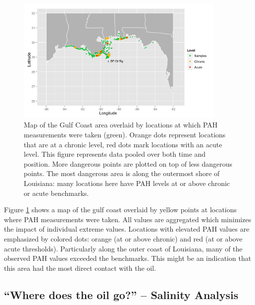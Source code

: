 \documentclass[authoryear,12pt]{elsarticle}
\begin{document}
\begin{figure}[htbp] %
   \centering
   \includegraphics[width=4in]{chron-acute-map.png} 
   \caption{Map of the Gulf Coast area overlaid by locations at which PAH measurements were taken (green). Orange dots represent locations that are at a chronic level, red dots mark locations with an acute level. This figure represents data pooled over both time and position. More dangerous points are plotted on top of less dangerous points. The most dangerous area is along the outermost shore of Louisiana: many locations here have PAH levels at or above chronic or acute benchmarks.}
   \label{pah-map}
\end{figure}


Figure \ref{pah-map} shows a map of the gulf coast overlaid by yellow points at locations where PAH measurements were taken. All values are aggregated which minimizes the impact of individual extreme values. Locations with elevated PAH values are emphasized by colored dots: orange (at or above chronic) and red (at or above acute thresholds). Particularly along the outer coast of Louisiana, many of the observed PAH values exceeded the benchmarks.  This might be an indication that this area had the most direct contact with the oil. 

\subsection{``Where does the oil go?'' -- Salinity Analysis}
\end{document}
